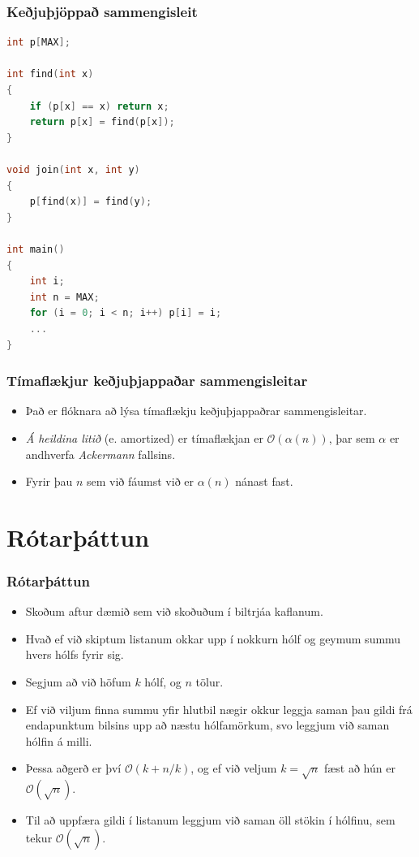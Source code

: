 \documentclass[handout]{beamer}
\begin{document}
\begin{frame}[fragile]
	\frametitle{Keðjuþjöppað sammengisleit}
\tiny
\begin{lstlisting}[language=C++]
int p[MAX];

int find(int x)
{
	if (p[x] == x) return x;
	return p[x] = find(p[x]);
}

void join(int x, int y)
{
	p[find(x)] = find(y);
}

int main()
{
	int i;
	int n = MAX;
	for (i = 0; i < n; i++) p[i] = i;
	...
}
\end{lstlisting}
\end{frame}

\begin{frame}
\frametitle{Tímaflækjur keðjuþjappaðar sammengisleitar}
\begin{itemize}
	\item<1-> Það er flóknara að lýsa tímaflækju keðjuþjappaðrar sammengisleitar.
	\item<2-> \emph{Á heildina litið} (e. amortized) er tímaflækjan er $\mathcal{O}(\alpha(n))$, þar sem $\alpha$ er andhverfa \emph{Ackermann} fallsins.
	\item<3-> Fyrir þau $n$ sem við fáumst við er $\alpha(n)$ nánast fast.
\end{itemize}
\end{frame}

\section[Rótarþáttun]{Rótarþáttun}

\begin{frame}
\frametitle{Rótarþáttun}
\begin{itemize}
	\item<1-> Skoðum aftur dæmið sem við skoðuðum í biltrjáa kaflanum.
	\item<2-> Hvað ef við skiptum listanum okkar upp í nokkurn hólf og geymum summu hvers hólfs fyrir sig.
	\item<3-> Segjum að við höfum $k$ hólf, og $n$ tölur.
	\item<4-> Ef við viljum finna summu yfir hlutbil nægir okkur leggja saman þau gildi frá endapunktum bilsins upp að næstu hólfamörkum,
		svo leggjum við saman hólfin á milli.
	\item<5-> Þessa aðgerð er því $\mathcal{O}(k + n/k)$, og ef við veljum $k = \sqrt{n}$ fæst að hún er $\mathcal{O}(\sqrt{n})$.
	\item<6-> Til að uppfæra gildi í listanum leggjum við saman öll stökin í hólfinu, sem tekur $\mathcal{O}(\sqrt{n})$.
\end{itemize}
\end{frame}
\end{document}
